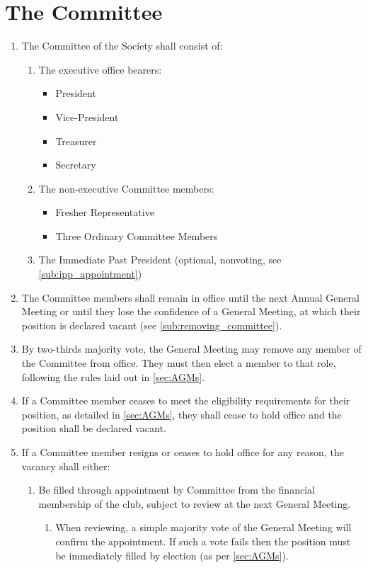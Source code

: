 \documentclass[a4paper]{article}
\newenvironment{enumsection}[1]{\section{#1} \begin{enumerate}[ref=\thesection.\theenumi]}{\end{enumerate}}
\begin{document}
\begin{enumsection}{The Committee} \label{sec:committee}
	\item The Committee of the Society shall consist of:
    \begin{enumerate}
    	\item The executive office bearers:
        \begin{itemize}
          \item President
          \item Vice-President
          \item Treasurer
          \item Secretary 
        \end{itemize}
        \item The non-executive Committee members:
        \begin{itemize}
            \item Fresher Representative
        	\item Three Ordinary Committee Members
        \end{itemize}
        \item The Immediate Past President (optional, nonvoting, see \cref{sub:ipp_appointment})
    \end{enumerate}
    \item The Committee members shall remain in office until the next Annual General Meeting or until they lose the confidence of a General Meeting, at which their position is declared vacant (see \cref{sub:removing_committee}).
    \item \label{sub:removing_committee} By two-thirds majority vote, the General Meeting may remove any member of the Committee from office. They must then elect a member to that role, following the rules laid out in \cref{sec:AGMs}.
    \item If a Committee member ceases to meet the eligibility requirements for their position, as detailed in \cref{sec:AGMs}, they shall cease to hold office and the position shall be declared vacant.
    \item \label{sub:committee_resign} If a Committee member resigns or ceases to hold office for any reason, the vacancy shall either:
    \begin{enumerate}
        \item Be filled through appointment by Committee from the financial membership of the club, subject to review at the next General Meeting.
        \begin{enumerate}
            \item When reviewing, a simple majority vote of the General Meeting will confirm the appointment. If such a vote fails then the position must be immediately filled by election (as per \cref{sec:AGMs}).

\end{enumerate}
\end{enumerate}
\end{enumsection}
\end{document}
